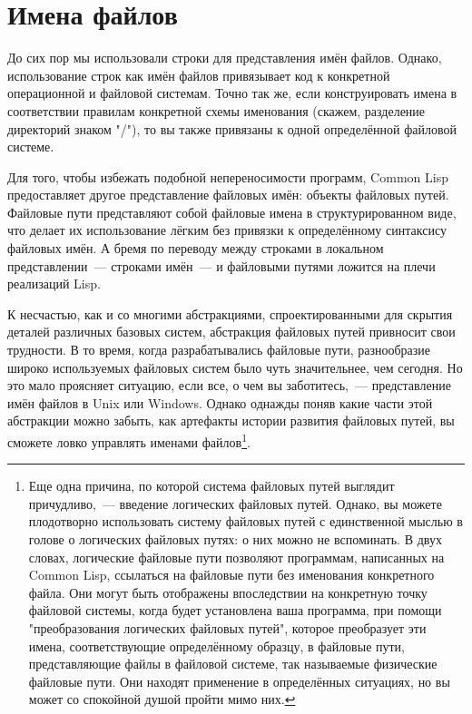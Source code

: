 \section{Имена файлов}

До сих пор мы использовали строки для представления имён файлов. Однако, использование
строк как имён файлов привязывает код к конкретной операционной и файловой системам. Точно
так же, если конструировать имена в соответствии правилам конкретной схемы именования
(скажем, разделение директорий знаком "/"), то вы также привязаны к одной определённой
файловой системе.

Для того, чтобы избежать подобной непереносимости программ, Common Lisp предоставляет
другое представление файловых имён: объекты файловых путей. Файловые пути представляют
собой файловые имена в структурированном виде, что делает их использование лёгким без
привязки к определённому синтаксису файловых имён. А бремя по переводу между строками в
локальном представлении~--- строками имён~--- и файловыми путями ложится на плечи реализаций
Lisp.

К несчастью, как и со многими абстракциями, спроектированными для скрытия деталей
различных базовых систем, абстракция файловых путей привносит свои трудности. В то время,
когда разрабатывались файловые пути, разнообразие широко используемых файловых систем было
чуть значительнее, чем сегодня. Но это мало проясняет ситуацию, если все, о чем вы
заботитесь,~--- представление имён файлов в Unix или Windows. Однако однажды поняв какие
части этой абстракции можно забыть, как артефакты истории развития файловых путей, вы
сможете ловко управлять именами файлов\footnote{Еще одна причина, по которой система
  файловых путей выглядит причудливо,~--- введение логических файловых путей. Однако, вы
  можете плодотворно использовать систему файловых путей с единственной мыслью в голове о
  логических файловых путях: о них можно не вспоминать. В двух словах, логические файловые
  пути позволяют программам, написанных на Common Lisp, ссылаться на файловые пути без
  именования конкретного файла. Они могут быть отображены впоследствии на конкретную точку
  файловой системы, когда будет установлена ваша программа, при помощи "преобразования
  логических файловых путей", которое преобразует эти имена, соответствующие определённому
  образцу, в файловые пути, представляющие файлы в файловой системе, так называемые
  физические файловые пути. Они находят применение в определённых ситуациях, но вы может
  со спокойной душой пройти мимо них.}.

